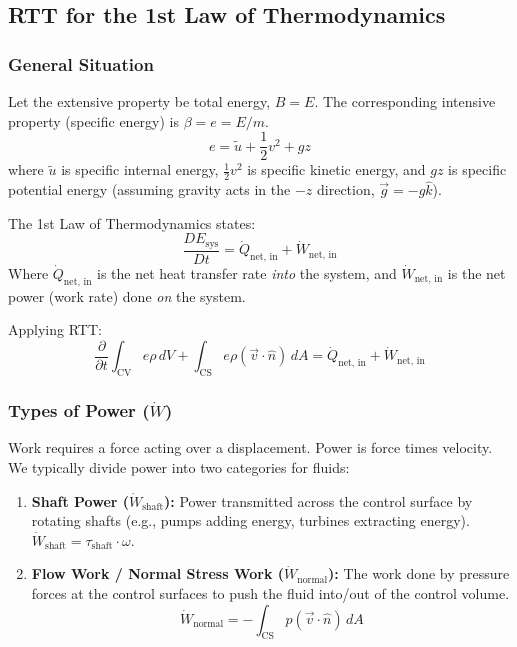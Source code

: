 \newpage

\subsection{RTT for the 1st Law of Thermodynamics}

\subsubsection{General Situation}
Let the extensive property be total energy, $B = E$. The corresponding intensive property (specific energy) is $\beta = e = E/m$.
\begin{equation}
    e = \tilde{u} + \frac{1}{2}v^2 + gz
\end{equation}
where $\tilde{u}$ is specific internal energy, $\frac{1}{2}v^2$ is specific kinetic energy, and $gz$ is specific potential energy (assuming gravity acts in the $-z$ direction, $\vec{g} = -g\hat{k}$).

The 1st Law of Thermodynamics states:
\begin{equation}
    \frac{DE_{\text{sys}}}{Dt} = \dot{Q}_{\text{net, in}} + \dot{W}_{\text{net, in}}
\end{equation}
Where $\dot{Q}_{\text{net, in}}$ is the net heat transfer rate \textit{into} the system, and $\dot{W}_{\text{net, in}}$ is the net power (work rate) done \textit{on} the system.

Applying RTT:
\begin{equation}
    \frac{\partial}{\partial t}\int_{\text{CV}} e\rho\,dV + \int_{\text{CS}} e\rho(\vec{v}\cdot\hat{n})\,dA = \dot{Q}_{\text{net, in}} + \dot{W}_{\text{net, in}}
\end{equation}

\subsubsection{Types of Power ($\dot{W}$)}
Work requires a force acting over a displacement. Power is force times velocity. We typically divide power into two categories for fluids:

\begin{enumerate}
    \item \textbf{Shaft Power ($\dot{W}_{\text{shaft}}$):} Power transmitted across the control surface by rotating shafts (e.g., pumps adding energy, turbines extracting energy). $\dot{W}_{\text{shaft}} = \tau_{\text{shaft}} \cdot \omega$.
    \item \textbf{Flow Work / Normal Stress Work ($\dot{W}_{\text{normal}}$):} The work done by pressure forces at the control surfaces to push the fluid into/out of the control volume.
    \begin{equation}
        \dot{W}_{\text{normal}} = -\int_{\text{CS}} p(\vec{v}\cdot\hat{n})\,dA
    \end{equation}
\end{enumerate}

